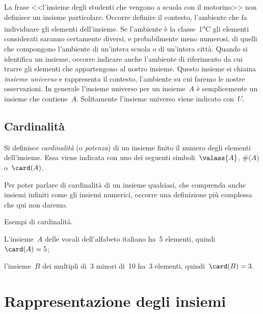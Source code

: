 La frase <<l'insieme degli studenti che vengono a scuola con il motorino>> non definisce un
insieme particolare. Occorre definire il contesto, l'ambiente che fa individuare gli elementi
dell'insieme. Se l'ambiente è la classe~1\textsuperscript{a}C gli elementi considerati saranno certamente diversi, e probabilmente meno numerosi, di quelli che compongono l'ambiente di un'intera scuola o di un'intera
città. Quando si identifica un insieme, occorre indicare anche l'ambiente di riferimento da cui trarre gli elementi che appartengono al nostro insieme. Questo insieme si chiama \emph{insieme universo} e rappresenta il contesto, l'ambiente su cui faremo le nostre osservazioni. In generale l'insieme universo per un insieme~$A$ è semplicemente un insieme che contiene~$A$. Solitamente l'insieme universo viene indicato con~$U$.

\subsection{Cardinalità}

\begin{definizione}
 Si definisce \emph{cardinalità} (o \emph{potenza}) di un insieme finito il numero
degli elementi dell'insieme. Essa viene indicata con uno dei seguenti simboli~$\valass{A}$, \#($A$) o~$\card(A)$.
\end{definizione}

Per poter parlare di cardinalità di un insieme qualsiasi, che
comprenda anche insiemi infiniti come gli insiemi numerici, occorre una
definizione più complessa che qui non daremo.

\begin{exrig}
 \begin{esempio}
 Esempi di cardinalità.
 \begin{enumeratea}
  \item L'insieme~$A$ delle vocali dell'alfabeto italiano ha~5 elementi, quindi~$\card(A)=5$;
  \item l'insieme~$B$ dei multipli di~3 minori di~10 ha~3 elementi, quindi~$\card(B)=3$.
 \end{enumeratea}
 \end{esempio}
\end{exrig}

\ovalbox{\risolvii \ref{ese:\thechapter.9}, \ref{ese:\thechapter.10}, \ref{ese:\thechapter.11}, \ref{ese:\thechapter.12}, \ref{ese:\thechapter.13}, \ref{ese:\thechapter.14}}

\section{Rappresentazione degli insiemi}

